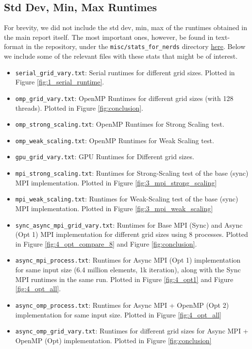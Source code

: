 \documentclass[a4paper,10pt]{article}
\begin{document}
\subsection{Std Dev, Min, Max Runtimes}
For brevity, we did not include the std dev, min, max of the runtimes obtained in the main report itself. The most important ones, however, be found in text-format in the repository, under the \verb|misc/stats_for_nerds| directory \href{https://github.com/paulmyr/DD2356-MethodsHPC/tree/master/5_project/misc/stats_for_nerds}{here}. Below we include some of the relevant files with these stats that might be of interest.
\begin{itemize}
\item \verb|serial_grid_vary.txt|: Serial runtimes for different grid sizes. Plotted in Figure \ref{fig:1_serial_runtime}.
\item \verb|omp_grid_vary.txt|: OpenMP Runtimes for different grid sizes (with 128 threads). Plotted in Figure \ref{fig:conclusion}.
\item \verb|omp_strong_scaling.txt|: OpenMP Runtimes for Strong Scaling test.
\item \verb|omp_weak_scaling.txt|: OpenMP Runtimes for Weak Scaling test.
\item \verb|gpu_grid_vary.txt|: GPU Runtimes for Different grid sizes.
\item \verb|mpi_strong_scaling.txt|: Runtimes for Strong-Scaling test of the base (sync) MPI implementation. Plotted in Figure \ref{fig:3_mpi_strong_scaling}
\item \verb|mpi_weak_scaling.txt|: Runtimes for Weak-Scaling test of the base (sync) MPI implementation. Plotted in Figure \ref{fig:3_mpi_weak_scaling}
\item \verb|sync_async_mpi_grid_vary.txt|: Runtimes for Base MPI (Sync) and Async (Opt 1) MPI implementation for different grid sizes using 8 processes. Plotted in Figure \ref{fig:4_opt_compare_8} and Figure \ref{fig:conclusion}.
\item \verb|async_mpi_process.txt|: Runtimes for Async MPI (Opt 1) implementation for same input size (6.4 million elements, 1k iteration), along with the Sync MPI runtimes in the same run. Plotted in Figure \ref{fig:4_opt1} and Figure \ref{fig:4_opt_all}.
\item \verb|async_omp_process.txt|: Runtimes for Async MPI + OpenMP (Opt 2) implementation for same input size. Plotted in Figure \ref{fig:4_opt_all}
\item \verb|async_omp_grid_vary.txt|: Runtimes for different grid sizes for Async MPI + OpenMP (Opt) implementation. Plotted in Figure \ref{fig:conclusion}
\end{itemize}


\end{document}
